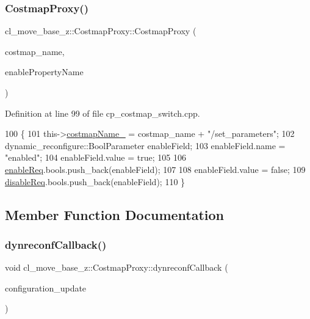 \subsubsection{\texorpdfstring{Costmap\+Proxy()}{CostmapProxy()}}
{\footnotesize\ttfamily cl\+\_\+move\+\_\+base\+\_\+z\+::\+Costmap\+Proxy\+::\+Costmap\+Proxy (\begin{DoxyParamCaption}\item[{std\+::string}]{costmap\+\_\+name,  }\item[{std\+::string}]{enable\+Property\+Name }\end{DoxyParamCaption})}



Definition at line 99 of file cp\+\_\+costmap\+\_\+switch.\+cpp.


\begin{DoxyCode}
100 \{
101     this->\hyperlink{classcl__move__base__z_1_1CostmapProxy_adb1ed877b9ec2ff7f9f73775dd4ead7b}{costmapName\_} = costmap\_name + \textcolor{stringliteral}{"/set\_parameters"};
102     dynamic\_reconfigure::BoolParameter enableField;
103     enableField.name = \textcolor{stringliteral}{"enabled"};
104     enableField.value = \textcolor{keyword}{true};
105 
106     \hyperlink{classcl__move__base__z_1_1CostmapProxy_aff2defa5d265d3e8efda4849eedd3500}{enableReq}.bools.push\_back(enableField);
107 
108     enableField.value = \textcolor{keyword}{false};
109     \hyperlink{classcl__move__base__z_1_1CostmapProxy_a798847a9ee787134e26326edc574020f}{disableReq}.bools.push\_back(enableField);
110 \}
\end{DoxyCode}


\subsection{Member Function Documentation}
\mbox{\label{classcl__move__base__z_1_1CostmapProxy_ac18a66844cf11a1d7a45dd7db3f954ec}} 
\subsubsection{\texorpdfstring{dynreconf\+Callback()}{dynreconfCallback()}}
{\footnotesize\ttfamily void cl\+\_\+move\+\_\+base\+\_\+z\+::\+Costmap\+Proxy\+::dynreconf\+Callback (\begin{DoxyParamCaption}\item[{const dynamic\+\_\+reconfigure\+::\+Config\+::\+Const\+Ptr \&}]{configuration\+\_\+update }\end{DoxyParamCaption})\hspace{0.3cm}{\ttfamily [private]}}



